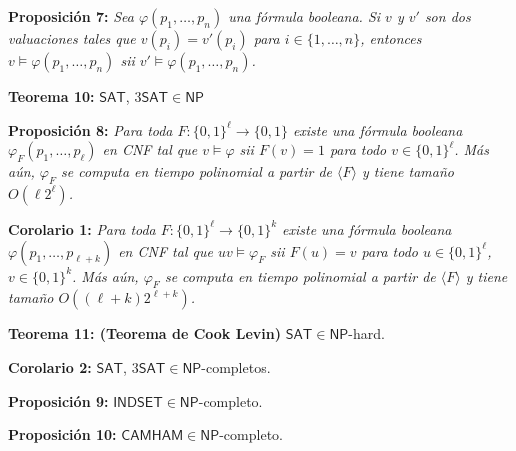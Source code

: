 \documentclass{article}
\begin{document}
\begin{flushleft}
  \textbf{Proposición 7:}
  \textit{Sea $\varphi(p_1,\dots, p_n)$ una fórmula booleana. Si $v$ y $v'$ son dos valuaciones tales que
  $v(p_i) = v'(p_i)$ para $i \in \{ 1, \dots, n\}$, entonces $v \models \varphi(p_1,\dots, p_n)$ sii
  $v' \models \varphi(p_1,\dots, p_n)$.}
\end{flushleft}

\begin{flushleft}
  \textbf{\hypertarget{teo10}{Teorema 10:}}
  $\mathsf{SAT}$, $3\mathsf{SAT} \in \mathsf{NP}$ 
\end{flushleft}

\begin{flushleft}
  \textbf{\hypertarget{prop8}{Proposición 8:}}
  \textit{Para toda $F : \{ 0,1 \}^\ell \rightarrow \{ 0,1 \}$ existe una fórmula booleana $\varphi_F(p_1,
  \dots, p_\ell)$ en CNF tal que $v \models \varphi$ sii $F(v) = 1$ para todo $v \in \{ 0,1 \}^\ell$. Más
  aún, $\varphi_F$ se computa en tiempo polinomial a partir de $\langle F \rangle$ y tiene tamaño $O(\ell
  2^\ell)$.} 
\end{flushleft}

\begin{flushleft}
  \textbf{Corolario 1:}
  \textit{Para toda $F : \{ 0,1 \}^\ell \rightarrow \{ 0,1 \}^k$ existe una fórmula booleana $\varphi(
  p_1, \dots, p_{\ell + k})$ en CNF tal que $uv \models \varphi_F$ sii $F(u) = v$ para todo $u \in \{
  0,1 \}^\ell$, $v \in \{0,1 \}^k$. Más aún, $\varphi_F$ se computa en tiempo polinomial a partir de 
  $\langle F \rangle$ y tiene tamaño $O((\ell + k)2^{\ell + k})$.}
\end{flushleft}

\begin{flushleft}
  \textbf{Teorema 11: \hypertarget{cooklevin}{\textcolor{Bittersweet}{(Teorema de Cook Levin)}}}
  $\mathsf{SAT} \in \mathsf{NP}$-hard. 
\end{flushleft}

\begin{flushleft}
  \textbf{Corolario 2:}
  $\mathsf{SAT}$, $3\mathsf{SAT} \in \mathsf{NP}$-completos. 
\end{flushleft}

\begin{flushleft}
  \textbf{Proposición 9:}
  $\mathsf{INDSET} \in \mathsf{NP}$-completo.
\end{flushleft}

\begin{flushleft}
  \textbf{Proposición 10:}
  $\mathsf{CAMHAM} \in \mathsf{NP}$-completo.
\end{flushleft}
\end{document}
